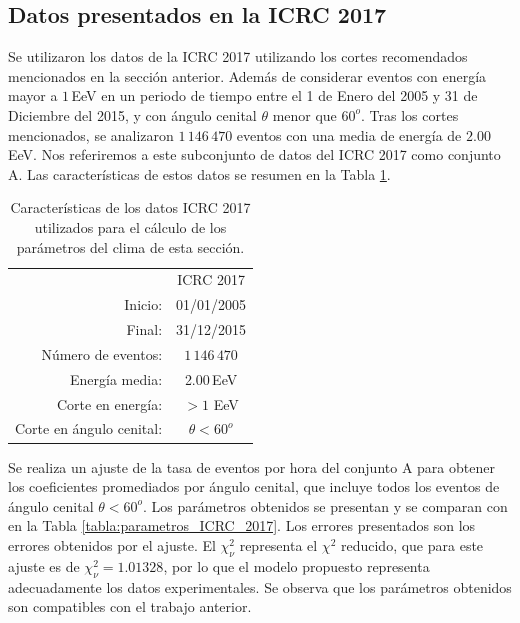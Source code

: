 
\subsection{Datos presentados en la ICRC 2017}\label{icrc2015}

Se utilizaron los datos de la ICRC 2017 utilizando los cortes recomendados mencionados en la sección anterior. Además de considerar eventos con energía mayor a $1\,$EeV en un periodo de tiempo entre el 1 de Enero del 2005 y 31 de Diciembre del 2015, y con ángulo cenital $\theta$ menor que $60^o$.  Tras los cortes mencionados, se analizaron $1\,146\,470$ eventos con una media de energía de $2.00\,$EeV. Nos referiremos a este subconjunto de datos del ICRC 2017  como conjunto A. Las características de estos datos se resumen en la Tabla \ref{tabla:caracteristicas_ICRC_2017}.
        \begin{table}[H]
            \centering
            \begin{tabular}{r|c|} \cline{2-2}
                & ICRC 2017 \\ \cline{2-2}
            Inicio:              & 01/01/2005 \\ 
            Final:               & 31/12/2015  \\ 
            Número de eventos:   & $1\,146\,470$ \\ 
            Energía media:       & 2.00\,EeV    				\\ 
            Corte en energía:    & $> 1$ EeV        				\\ 
            Corte en ángulo cenital:		& $\theta < 60^o$ 				\\ \cline{2-2}
            \end{tabular}
        \caption{Características de los datos ICRC 2017 utilizados para el cálculo de los parámetros del clima de esta sección. } \label{tabla:caracteristicas_ICRC_2017}
        \end{table}

        Se realiza un ajuste de la tasa de eventos por hora del conjunto A para obtener los coeficientes promediados por ángulo cenital, que incluye todos los eventos de ángulo cenital $\theta< 60^o$. Los parámetros obtenidos se presentan y se comparan con \cite{aab2017impact} en la Tabla \ref{tabla:parametros_ICRC_2017}. Los errores presentados son los errores obtenidos por el ajuste. El $\chi^2_\nu$ representa el $\chi^2$ reducido, que para este ajuste es de $\chi^2_\nu=1.01328$, por lo que el modelo propuesto representa adecuadamente los datos experimentales. Se observa que los parámetros obtenidos son compatibles con el trabajo anterior.

